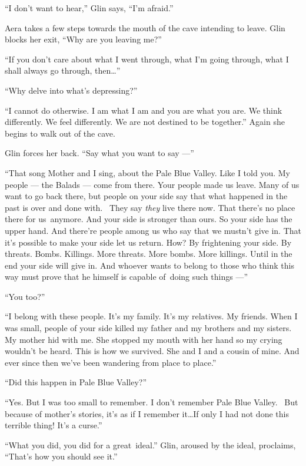 \documentclass[twoside,11pt]{book}
\begin{document}
``I don't want to hear,'' Glin says, ``I'm afraid.''

Aera takes a few steps towards the mouth{ }of the cave intending to leave. Glin blocks her exit,
``Why are you leaving me?''

``If you don't care about what I went through, what I'm going through, what I shall always go through, then{\ldots}''

``Why delve into what's depressing?''

``I cannot do otherwise. I am what I am and you are what you are. We think differently. We feel differently.
We are not destined to be together.'' Again she begins to walk out of the cave.

Glin forces her back. ``Say what you want to say ---''

``That song Mother and I sing, about the Pale Blue Valley. Like I told you. My people --- the Balads --- come
from there. Your people made us leave. Many of us want to go back there, but people on your side say that what happened
in the past is over and done with. ~They say \textit{they }live there now. That there's no place there for us~anymore.
And your side is stronger than ours. So your side has the upper hand. And there're people among us who say that we
mustn't give in. That it's possible to make your side let us return. How? By frightening your side. By threats. Bombs.
Killings. More threats. More bombs. More killings. Until in the end your side will give in. And whoever wants to belong
to those who think this way must prove that he himself is capable of~doing such things ---''

``You too?''

``I belong with these people. It's my family. It's my relatives. My friends. When I was small, people of
your side killed my father and my brothers and my sisters. My mother hid with me. She stopped my mouth with her hand so
my crying wouldn't be heard. This is how we survived. She and I and a cousin of mine. And ever since then we've been
wandering from place to place.''

``Did this happen in Pale Blue Valley?''

``Yes. But I was too small to remember. I don't remember Pale Blue Valley. ~But because of mother's
stories, it's as if I remember it{\ldots}If only I had not done this terrible thing! It's a curse.''

``What you did, you did for a great~ideal.'' Glin, aroused by{ }the ideal, proclaims,
``That's how you should see it.''
\end{document}
